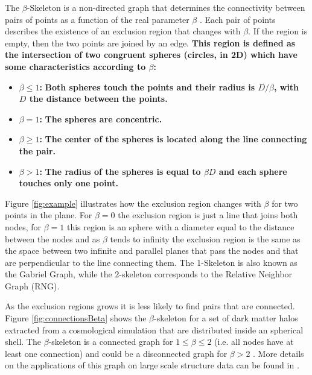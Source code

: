 \documentclass[fleqn,usenatbib]{mnras}
\begin{document}
The $\beta$-Skeleton is a non-directed graph that determines the connectivity between pairs
of points as a function of the real parameter $\beta$ \citep{1985Kirkpatrick}. 
Each pair of points describes the existence of an exclusion region that changes with $\beta$. 
If the region is empty, then the two points are joined by an edge.
\textbf{This region is defined as the intersection of two congruent spheres (circles, in 2D) which have some characteristics according to $\beta$:}

\begin{itemize}
    \item \textbf{$\beta \leq 1$: } \textbf{Both spheres touch the points and their radius is $D/\beta$, with $D$ the distance between the points.}
    \item \textbf{$\beta = 1$: }\textbf{The spheres are concentric.}
    \item \textbf{$\beta\geq 1$: }\textbf{The center of the spheres is located along the line connecting the pair.}
    \item \textbf{$\beta>1$: }\textbf{The radius of the spheres is equal to $\beta D$ and each sphere touches only one point.}


\end{itemize}

Figure \ref{fig:example} illustrates how the exclusion region changes with $\beta$ for 
two points in the plane. 
For $\beta=0$ the exclusion region is just a line that joins both nodes, for $\beta=1$
this region is an sphere%
with a diameter equal to the distance between the nodes and 
as $\beta$ tends to infinity the exclusion region is the same as the space between two infinite and parallel planes that pass the nodes and that are perpendicular to the line connecting them.
The 1-Skeleton is also known as the Gabriel Graph, while the $2$-skeleton corresponds to the Relative Neighbor Graph (RNG).

As the exclusion regions grows it is less likely to find pairs that are connected.
Figure \ref{fig:connectionsBeta} shows the $\beta$-skeleton for a set of dark matter halos extracted from a cosmological simulation that are distributed inside an spherical shell.
The $\beta$-skeleton is a connected graph for $1\leq \beta\leq 2$
(i.e. all nodes have at least
one connection) and could be a disconnected graph for $\beta>2$ \citep{bose2002spanning}.
More details on the applications of this graph on large scale structure data
can be found in \citep{2019MNRAS.485.5276F}.
\end{document}
